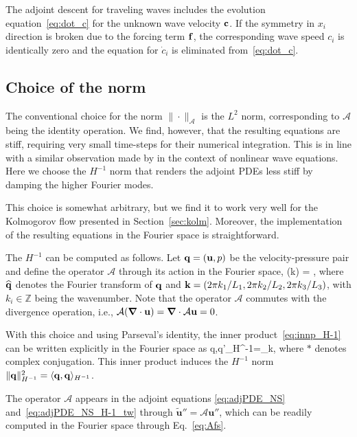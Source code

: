 \documentclass{article}
\begin{document}
The adjoint descent for traveling waves includes the evolution equation~\eqref{eq:dot_c}
for the unknown wave velocity $\mathbf c$.
If the symmetry in $x_i$ direction is broken due to the forcing term $\mathbf f$, the corresponding
wave speed $c_i$ is identically zero and the equation for $\dot c_i$ is eliminated
from~\eqref{eq:dot_c}.

\subsection{Choice of the norm}\label{sec:H-1}
The conventional choice for the norm $\|\cdot\|_{\mathcal A}$ is the $L^2$ norm, corresponding
to $\mathcal A$ being the identity operation. We find,
however, that the resulting equations are stiff, requiring very small
time-steps for their numerical integration. This is in line with a similar observation
made by in the context of nonlinear wave equations.
Here we choose the $H^{-1}$ norm that renders the
adjoint PDEs less stiff by damping the higher Fourier modes.

This choice is somewhat
arbitrary, but we find it to work very well for the Kolmogorov flow presented in
Section~\ref{sec:kolm}. Moreover, the implementation of the resulting equations
in the Fourier space is straightforward.

The $H^{-1}$ can be computed as follows. Let $\mathbf q=(\mathbf u,p)$ be the
velocity-pressure pair and define
the operator $\mathcal A$ through its action in
the Fourier space,
\beq
{}(\vc k) = ,
\label{eq:Afs}
\eeq
where $\widehat{\mathbf q}$ denotes the Fourier transform of $\mathbf q$ and $\mathbf
k=(2\pi k_1/L_1,2\pi k_2/L_2,2\pi k_3/L_3)$, with $k_i\in\mathbb Z$ being the
wavenumber.
Note that the operator $\mathcal A$ commutes with the
divergence operation, i.e., $\mathcal A (\mbox{\boldmath $\nabla$}\cdot \mathbf u)=\mbox{\boldmath $\nabla$}\cdot\mathcal A\mathbf u=0$.

With this choice and using Parseval's identity,
the inner product~\eqref{eq:innp_H-1} can be written explicitly in the Fourier space as
\beq
\langle \vc q,\vc q'\rangle_{H^{-1}}=\sum_{\vc k},
\label{bogusTime}
\eeq
where $\ast$ denotes complex conjugation. This inner product induces the $H^{-1}$ norm
$\|\mathbf q\|_{H^{-1}}^2=\langle \mathbf q,\mathbf q\rangle_{H^{-1}}$.

The operator $\mathcal A$ appears in the adjoint equations
\eqref{eq:adjPDE_NS} and~\eqref{eq:adjPDE_NS_H-1_tw} through
$\tilde{\mathbf u}''=\mathcal A\mathbf u''$,
which can be readily computed in the Fourier space through
Eq.~\eqref{eq:Afs}.
\end{document}
